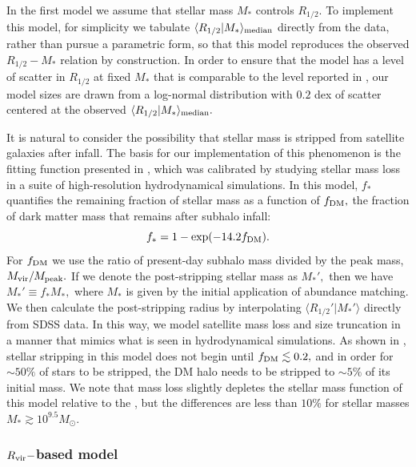 \documentclass[usenatbib,usegraphicx,letterpaper]{mn2e}
\newcommand{\beq}{\begin{equation}}
\newcommand{\eeq}{\end{equation}}
\newcommand{\rhalf}{R_{1/2}}
\newcommand{\mstar}{M_{\ast}}
\newcommand{\rvir}{R_{\rm vir}}
\newcommand{\median}[2]{\langle{#1}\vert{#2}\rangle_{\rm median}}
\newcommand{\msun}{M_\odot}
\begin{document}
In the first model we assume that stellar mass $\mstar$ controls $\rhalf.$ To implement this model, for simplicity we tabulate $\median{\rhalf}{\mstar}$ directly from the data, rather than pursue a parametric form, so that this model reproduces the observed $\rhalf-\mstar$ relation by construction. In order to ensure that the model has a level of scatter in $\rhalf$ at fixed $\mstar$ that is comparable to the level reported in \citet{somerville_etal17}, our model sizes are drawn from a log-normal distribution with $0.2$ dex of scatter centered at the observed $\median{\rhalf}{\mstar}.$ 

It is natural to consider the possibility that stellar mass is stripped from satellite galaxies after infall. The basis for our implementation of this phenomenon is the fitting function presented in \citet{smith_etal16}, which was calibrated by studying stellar mass loss in a suite of high-resolution hydrodynamical simulations. In this model, $f_{\ast}$ quantifies the remaining fraction of stellar mass as a function of $f_{\rm DM},$ the fraction of dark matter mass that remains after subhalo infall:
\beq
f_{\ast} = 1 - \exp(-14.2f_{\rm DM}).
\eeq
For $f_{\rm DM}$ we use the ratio of present-day subhalo mass divided by the peak mass, $M_{\rm vir}/M_{\rm peak}.$ If we denote the post-stripping stellar mass as $M_{\ast}',$ then we have $M_{\ast}'\equiv f_{\ast}M_{\ast},$ where $M_{\ast}$ is given by the initial application of abundance matching. We then calculate the post-stripping radius by interpolating $\langle\rhalf'\vert\mstar'\rangle$ directly from SDSS data. In this way, we model satellite mass loss and  size truncation in a manner that mimics what is seen in hydrodynamical simulations. As shown in \citet{smith_etal16}, stellar stripping in this model does not begin until $f_{\rm DM}\lesssim0.2,$ and in order for $\sim50\%$ of stars to be stripped, the DM halo needs to be stripped to $\sim5\%$ of its initial mass. We note that mass loss slightly depletes the stellar mass function of this model relative to the \citet{moustakas_etal13}, but the differences are less than $10\%$ for stellar masses $\mstar\gtrsim10^{9.5}\msun.$ 

\subsubsection{$\rvir-$based model}
\label{subsubsec:rvirmodel}
\end{document}
